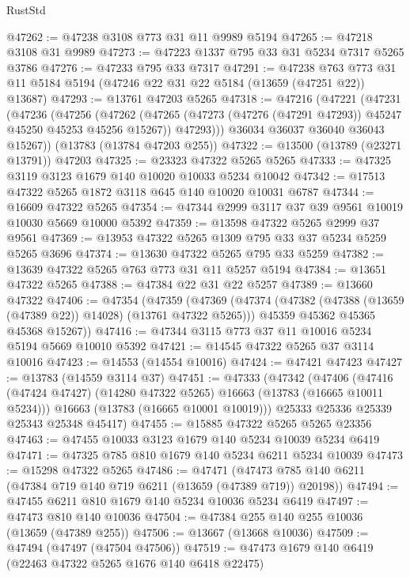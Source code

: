 \begin{lexlean}{RustStd}
\begin{coremodule}
@47262 := @47238 @3108 @773 @31 @11 @9989 @5194
@47265 := @47218 @3108 @31 @9989
@47273 := @47223 @1337 @795 @33 @31 @5234 @7317 @5265 @3786
@47276 := @47233 @795 @33 @7317
@47291 := @47238
    @763
    @773
    @31
    @11
    @5184
    @5194
    (@47246 @22 @31 @22 @5184 (@13659 (@47251 @22)) @13687)
@47293 := @13761 @47203 @5265
@47318 := @47216
    (@47221
      (@47231
        (@47236
          (@47256
            (@47262
              (@47265 (@47273 (@47276 (@47291 @47293)) @45247 @45250 @45253 @45256 @15267))
              @47293)))
        @36034
        @36037
        @36040
        @36043
        @15267))
    (@13783 (@13784 @47203 @255))
@47322 := @13500 (@13789 (@23271 @13791)) @47203
@47325 := @23323 @47322 @5265 @5265
@47333 := @47325 @3119 @3123 @1679 @140 @10020 @10033 @5234 @10042
@47342 := @17513 @47322 @5265 @1872 @3118 @645 @140 @10020 @10031 @6787
@47344 := @16609 @47322 @5265
@47354 := @47344 @2999 @3117 @37 @39 @9561 @10019 @10030 @5669 @10000 @5392
@47359 := @13598 @47322 @5265 @2999 @37 @9561
@47369 := @13953 @47322 @5265 @1309 @795 @33 @37 @5234 @5259 @5265 @3696
@47374 := @13630 @47322 @5265 @795 @33 @5259
@47382 := @13639 @47322 @5265 @763 @773 @31 @11 @5257 @5194
@47384 := @13651 @47322 @5265
@47388 := @47384 @22 @31 @22 @5257
@47389 := @13660 @47322
@47406 := @47354
    (@47359
      (@47369
        (@47374 (@47382 (@47388 (@13659 (@47389 @22)) @14028) (@13761 @47322 @5265)))
        @45359
        @45362
        @45365
        @45368
        @15267))
@47416 := @47344 @3115 @773 @37 @11 @10016 @5234 @5194 @5669 @10010 @5392
@47421 := @14545 @47322 @5265 @37 @3114 @10016
@47423 := @14553 (@14554 @10016)
@47424 := @47421 @47423
@47427 := @13783 (@14559 @3114 @37)
@47451 := @47333
    (@47342
      (@47406
        (@47416 (@47424 @47427) (@14280 @47322 @5265) @16663 (@13783 (@16665 @10011 @5234)))
        @16663
        (@13783 (@16665 @10001 @10019)))
      @25333
      @25336
      @25339
      @25343
      @25348
      @45417)
@47455 := @15885 @47322 @5265 @5265 @23356
@47463 := @47455 @10033 @3123 @1679 @140 @5234 @10039 @5234 @6419
@47471 := @47325 @785 @810 @1679 @140 @5234 @6211 @5234 @10039
@47473 := @15298 @47322 @5265
@47486 := @47471
    (@47473 @785 @140 @6211 (@47384 @719 @140 @719 @6211 (@13659 (@47389 @719)) @20198))
@47494 := @47455 @6211 @810 @1679 @140 @5234 @10036 @5234 @6419
@47497 := @47473 @810 @140 @10036
@47504 := @47384 @255 @140 @255 @10036 (@13659 (@47389 @255))
@47506 := @13667 (@13668 @10036)
@47509 := @47494 (@47497 (@47504 @47506))
@47519 := @47473 @1679 @140 @6419 (@22463 @47322 @5265 @1676 @140 @6418 @22475)

\end{coremodule}
\end{lexlean}
